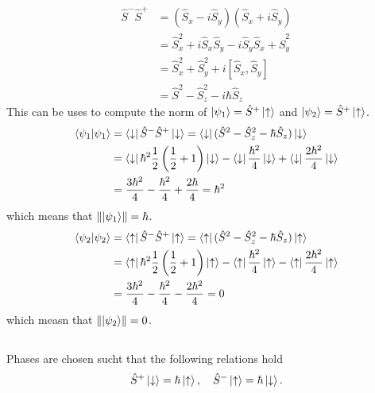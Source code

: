 \documentclass{article}
\begin{document}
\subsection{}
\begin{align*}
\hat{S}^-\hat{S}^+ &=(\hat{S}_x-i\hat{S}_y)(\hat{S}_x+i\hat{S}_y) \\
&= \hat{S}_x^2+i\hat{S}_x\hat{S}_y-i\hat{S}_y\hat{S}_x+\hat{S}_y^2 \\
&= \hat{S}_x^2+\hat{S}_y^2+i[\hat{S}_x,\hat{S}_y] \\
&= \hat{S}^2-\hat{S}_z^2-i\hbar\hat{S}_z
\end{align*}
This can be uses to compute the norm of $\ket{\psi_1} = \hat{S}^+\ket{\uparrow}$ and $\ket{\psi_2} = \hat{S}^+\ket{\uparrow}$.
\begin{align*}
\braket{\psi_1} &= \bra{\downarrow}\hat{S}^-\hat{S}^+\ket{\downarrow} = \bra{\downarrow}(\hat{S}^2-\hat{S}_z^2-\hbar\hat{S}_z)\ket{\downarrow} \\
&= \bra{\downarrow}\hbar^2\frac{1}{2}\left(\frac{1}{2} +1 \right)\ket{\downarrow} -\bra{\downarrow}\frac{\hbar^2}{4} \ket{\downarrow} +\bra{\downarrow}\frac{2\hbar^2}{4} \ket{\downarrow} \\
&= \frac{3\hbar^2}{4} -\frac{\hbar^2}{4}+\frac{2\hbar}{4} = \hbar^2 
\end{align*}
which means that $\norm{\ket{\psi_1}} = \hbar$.
\begin{align*}
\braket{\psi_2} &= \bra{\uparrow}\hat{S}^-\hat{S}^+\ket{\uparrow} = \bra{\uparrow}(\hat{S}^2-\hat{S}_z^2-\hbar\hat{S}_z)\ket{\uparrow} \\
&= \bra{\uparrow}\hbar^2\frac{1}{2}\left(\frac{1}{2} +1 \right)\ket{\uparrow} -\bra{\uparrow}\frac{\hbar^2}{4} \ket{\uparrow} -\bra{\uparrow}\frac{2\hbar^2}{4} \ket{\uparrow} \\
&= \frac{3\hbar^2}{4} -\frac{\hbar^2}{4}-\frac{2\hbar^2}{4} = 0
\end{align*}
which measn that $\norm{\ket{\psi_2}} = 0$.

\subsection{}

Phases are chosen sucht that the following relations hold
\begin{equation*}
\hat{S}^+\ket{\downarrow}=\hbar\ket{\uparrow}, \quad \hat{S}^-\ket{\uparrow}=\hbar\ket{\downarrow}.
\end{equation*}
\end{document}
